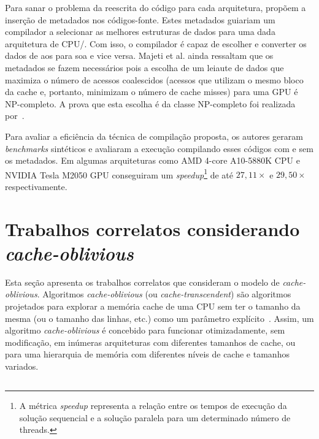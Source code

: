 Para sanar o problema da reescrita do código para cada arquitetura,  propõem a inserção de metadados nos códigos-fonte. Estes metadados guiariam um compilador a selecionar as melhores estruturas de dados para uma dada arquitetura de CPU\@/\@GPU. Com isso, o compilador é capaz de escolher e converter os dados de \ac{aos} para \ac{soa} e vice versa.
Majeti et al. ainda ressaltam que os metadados se fazem necessários pois a escolha de um leiaute de dados que maximiza o número de acessos coalescidos (acessos que utilizam o mesmo bloco da cache e, portanto, minimizam o número de cache misses) para uma GPU é NP-completo. A prova que esta escolha é da classe NP-completo foi realizada por~.


Para avaliar a eficiência da técnica de compilação proposta, os autores geraram \textit{benchmarks} sintéticos e avaliaram a execução compilando esses códigos com e sem os metadados. Em algumas arquiteturas como AMD 4-core A10-5880K CPU e NVIDIA Tesla M2050 GPU conseguiram um \textit{speedup}\footnote{A métrica \textit{speedup} representa a relação entre os tempos de execução da solução sequencial e a solução paralela para um determinado número de threads.} de até $27,11 \times$ e $29,50 \times$ respectivamente.

\section{Trabalhos correlatos considerando \textit{cache-oblivious}}
\label{sec:trabalhos_cache_oblivous}

Esta seção apresenta os trabalhos correlatos que consideram o modelo de \textit{cache-oblivious}.
Algoritmos \textit{cache-oblivious} (ou \textit{cache-tran\-scen\-dent}) são algoritmos projetados para explorar a memória cache de uma CPU sem ter o tamanho da mesma (ou o tamanho das linhas, etc.) como um parâmetro explícito~\cite{frigo1999cache}. Assim, um algoritmo \textit{cache-oblivious} é concebido para funcionar otimizadamente, sem modificação, em inúmeras arquiteturas com diferentes tamanhos de cache, ou para uma hierarquia de memória com diferentes níveis de cache e tamanhos variados.

\subsection{}

